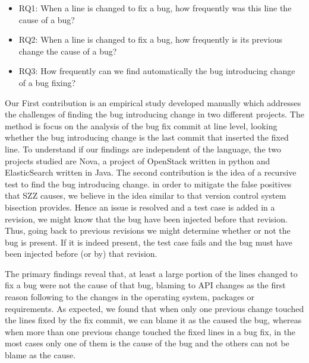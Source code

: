 \documentclass[conference]{IEEEtran}
\begin{document}
\begin{itemize}
	\item RQ1: When a line is changed to fix a bug, how frequently was this line the cause of a bug?
	\item RQ2: When a line is changed to fix a bug, how frequently is its previous change the cause of a bug?
	\item RQ3: How frequently can we find automatically the bug introducing change of a bug fixing?
\end{itemize}

Our First contribution is an empirical study developed manually which addresses the challenges of finding the bug introducing change in two different projects. The method is focus on the analysis of the bug fix commit at line level, looking whether the bug introducing change is the last commit that inserted the fixed line. To understand if our findings are independent of the language, the two projects studied are Nova, a project of OpenStack written in python and ElasticSearch written in Java. The second contribution is the idea of a recursive test to find the bug introducing change. in order to mitigate the false positives that SZZ causes, we believe in the idea similar to that version control system bisection provides. Hence an issue is resolved and a test case is added in a revision, we might know that the bug have been injected before that revision. Thus, going back to previous revisions we might determine whether or not the bug is present. If it is indeed present, the test case fails and the bug must have been injected before (or by) that revision.

The primary findings reveal that, at least a large portion of the lines changed to fix a bug were not the cause of that bug, blaming to API changes as the first reason following to the changes in the operating system, packages or requirements. As expected, we found that when only one previous change touched the lines fixed by the fix commit, we can blame it as the caused the bug, whereas when more than one previous change touched the fixed lines in a bug fix, in the most cases only one of them is the cause of the bug and the others can not be blame as the cause.
\end{document}
